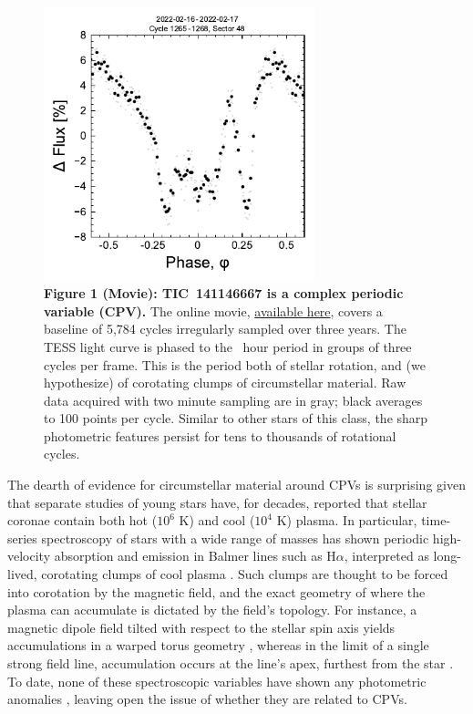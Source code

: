 \documentclass{nature3}
\begin{document}
\begin{figure}[!t]
  \centering
  \includegraphics[width=0.7\textwidth]{figures/f1.pdf}
  \captionsetup{labelformat=empty}
  \caption{{\bf Figure 1 (Movie):  TIC~141146667 is a complex periodic
  variable (CPV).}  The online movie,
  \href{https://lgbouma.com/movies/TIC141146667_20250116.mp4}{available here},
  covers a baseline of 5{,}784 cycles irregularly sampled over three
  years.  The TESS light curve is phased to the \periodhr\ hour period
  in groups of three cycles per frame.  This is the period both of
  stellar rotation, and (we hypothesize) of corotating clumps of
  circumstellar material.  Raw data acquired with two minute sampling
  are in gray; black averages to 100 points per cycle.  Similar to
  other stars of this class, the sharp photometric features persist
  for tens to thousands of rotational cycles. }
  \label{fig:lc}
\end{figure}

The dearth of evidence for circumstellar material around CPVs is
surprising given that separate studies of young stars have, for
decades, reported that stellar coronae contain both hot ($10^6$ K) and
cool ($10^4$ K) plasma. In particular, time-series spectroscopy of stars
with a wide range of masses has shown periodic high-velocity
absorption and emission in Balmer lines such as H$\alpha$, interpreted
as long-lived, corotating clumps of cool plasma
\cite{CollierCameron1989,CollierCameron1992,Barnes2000,Donati2000,Dunstone2006,Skelly2008,Leitzinger2016,Cang2021}.
Such clumps are thought to be forced into corotation by the magnetic
field, and the exact geometry of where the plasma can accumulate is
dictated by the field's topology.  For instance, a magnetic dipole field
tilted with respect to the stellar spin axis
yields accumulations in a warped torus geometry
\cite{Townsend2005}, whereas in the limit of a single strong field
line, accumulation occurs at the line's apex, furthest from the star
\cite{Waugh2022}.  To date, none of these spectroscopic variables have
shown any photometric anomalies \cite{Bouma2024}, leaving open the
issue of whether they are related to CPVs.
\end{document}

